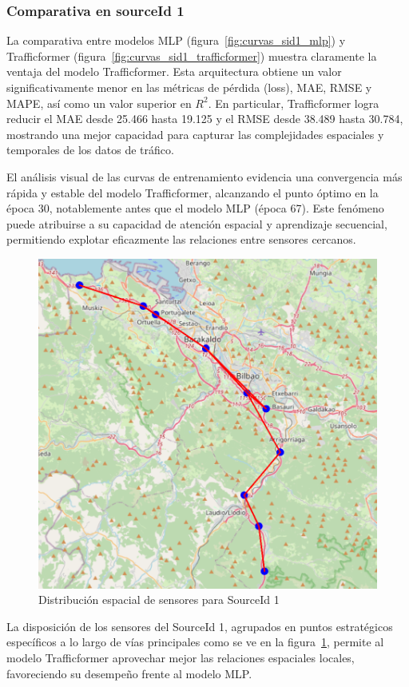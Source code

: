 \subsubsection*{Comparativa en sourceId 1}

La comparativa entre modelos MLP (figura~\ref{fig:curvas_sid1_mlp}) y Trafficformer (figura~\ref{fig:curvas_sid1_trafficformer}) muestra claramente la ventaja del modelo Trafficformer. Esta arquitectura obtiene un valor significativamente menor en las métricas de pérdida (loss), MAE, RMSE y MAPE, así como un valor superior en $R^2$. En particular, Trafficformer logra reducir el MAE desde 25.466 hasta 19.125 y el RMSE desde 38.489 hasta 30.784, mostrando una mejor capacidad para capturar las complejidades espaciales y temporales de los datos de tráfico.

El análisis visual de las curvas de entrenamiento evidencia una convergencia más rápida y estable del modelo Trafficformer, alcanzando el punto óptimo en la época 30, notablemente antes que el modelo MLP (época 67). Este fenómeno puede atribuirse a su capacidad de atención espacial y aprendizaje secuencial, permitiendo explotar eficazmente las relaciones entre sensores cercanos.

\begin{figure}[H]
	\centering
	\includegraphics[width=0.7\linewidth]{includes/cap5/source_id_1_meters_mask.png}
	\caption{Distribución espacial de sensores para SourceId 1}
	\label{fig:sensores_sid1}
\end{figure}

La disposición de los sensores del SourceId 1, agrupados en puntos estratégicos específicos a lo largo de vías principales como se ve en la figura~\ref{fig:sensores_sid1}, permite al modelo Trafficformer aprovechar mejor las relaciones espaciales locales, favoreciendo su desempeño frente al modelo MLP.


